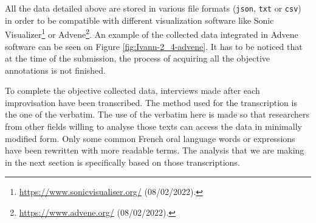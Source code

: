 \documentclass{article}
\begin{document}

All the data detailed above are stored in various file formats (\texttt{json}, \texttt{txt} or \texttt{csv}) in order to be compatible with different visualization software like Sonic Visualizer\footnote{\url{https://www.sonicvisualiser.org/} (08/02/2022).} or Advene\footnote{\url{https://www.advene.org/} (08/02/2022).}. An example of the collected data integrated in Advene software can be seen on Figure \ref{fig:Ivann-2_4-advene}. %
It has to be noticed that at the time of the submission, the process of acquiring all the objective annotations is not finished.

To complete the objective collected data, interviews made after each improvisation have been transcribed.  The me\-thod used for the transcription is the one of the verbatim. The use of the verbatim here is made so that researchers from other fields willing to analyse those texts can access the data in minimally modified form. Only some common French oral language words or expressions have been rewritten with more readable terms. The analysis that we are making in the next section is specifically based on those transcriptions. 




\end{document}
